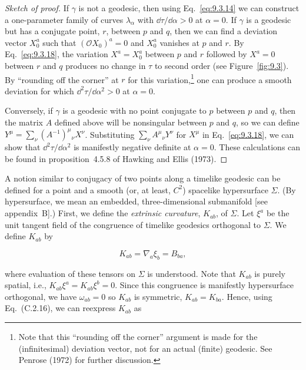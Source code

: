 \begin{proof}[Sketch of proof]
If \(\gamma\) is not a geodesic, then using Eq.~\eqref{eq:9.3.14} we can construct a
one-parameter family of curves \(\lambda_\alpha\) with
\(\dd\tau/\dd\alpha>0\) at \(\alpha=0\). If \(\gamma\) is a geodesic but has a
conjugate point, \(r\), between \(p\) and \(q\), then we can find a deviation vector
\(X_0^a\) such that \((\mathcal OX_0)^a=0\) and \(X_0^a\) vanishes at \(p\) and
\(r\). By Eq.~\eqref{eq:9.3.18}, the variation \(X^a=X_0^a\) between \(p\) and \(r\)
followed by \(X^a=0\) between \(r\) and \(q\) produces no change in \(\tau\) to
second order (see Figure~\ref{fig:9.3}). By ``rounding off the corner'' at \(r\) for
this variation,\footnote{Note that this ``rounding off the corner'' argument is made for the
(infinitesimal) deviation vector, not for an actual (finite) geodesic. See Penrose
(1972) for further discussion.} one can produce a smooth deviation for which
\(\dd^2\tau/\dd\alpha^2>0\) at \(\alpha=0\).



Conversely, if \(\gamma\) is a geodesic with no point conjugate to \(p\) between
\(p\) and \(q\), then the matrix \(A\) defined above will be nonsingular between
\(p\) and \(q\), so we can define
\(Y^\mu=\sum_\nu(A^{-1})^\mu{}_\nu X^\nu\). Substituting
\(\sum_\nu A^\mu{}_\nu Y^\nu\) for \(X^\mu\) in Eq.~\eqref{eq:9.3.18}, we can show
that \(\dd^2\tau/\dd\alpha^2\) is manifestly negative definite at \(\alpha=0\).
These calculations can be found in proposition~4.5.8 of Hawking and Ellis (1973).
\end{proof}


A notion similar to conjugacy of two points along a timelike geodesic can be defined
for a point and a smooth (or, at least, \(C^2\)) spacelike hypersurface \(\Sigma\). (By
hypersurface, we mean an embedded, three-dimensional submanifold [see appendix~B].)
First, we define the \emph{extrinsic curvature}, \(K_{ab}\), of \(\Sigma\). Let \(\xi^a\) be
the unit tangent field of the congruence of timelike geodesics orthogonal to \(\Sigma\).
We define \(K_{ab}\) by

\begin{equation}
  K_{ab}=\nabla_a\xi_b=B_{ba} ,
  \tag{9.3.19}\label{eq:9.3.19}
\end{equation}

where evaluation of these tensors on \(\Sigma\) is understood. Note that \(K_{ab}\) is
purely spatial, i.e., \(K_{ab}\xi^a=K_{ab}\xi^b=0\). Since this congruence is
manifestly hypersurface orthogonal, we have \(\omega_{ab}=0\) so \(K_{ab}\) is
symmetric, \(K_{ab}=K_{ba}\). Hence, using Eq.~(C.2.16), we can reexpress \(K_{ab}\) as


